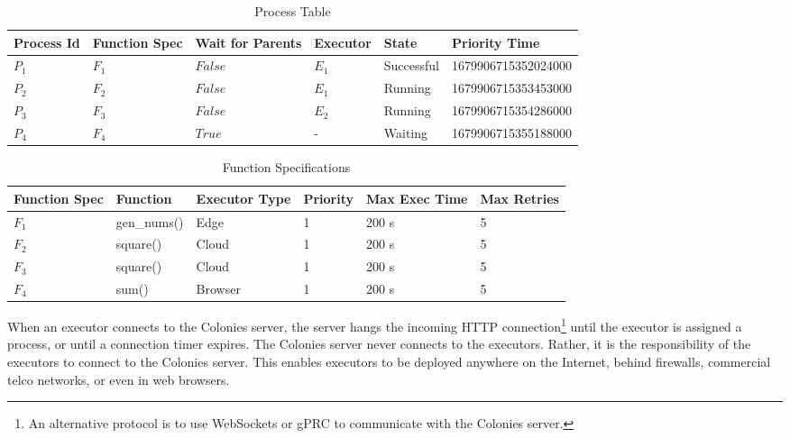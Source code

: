 \documentclass{article}
\begin{document}
\begin{table}[t]
	\caption{Process Table}
	\centering
	\begin{tabular}{llllll}
		\toprule
		\cmidrule(r){1-2}
        Process Id & Function Spec & Wait for Parents & Executor  & State      & Priority Time \\
		\midrule
        $P_{1}$    & $F_{1}$       & $False$          & $E_{1}$   & Successful & 1679906715352024000 \\
        $P_{2}$    & $F_{2}$       & $False$          & $E_{1}$   & Running    & 1679906715353453000 \\
        $P_{3}$    & $F_{3}$       & $False$          & $E_{2}$   & Running    & 1679906715354286000 \\
        $P_{4}$    & $F_{4}$       & $True$           & -         & Waiting    & 1679906715355188000 \\
		\bottomrule
	\end{tabular}
	\label{proctable}
\end{table}

\begin{table}[t]
	\caption{Function Specifications}
	\centering
	\begin{tabular}{llllll}
		\toprule
		\cmidrule(r){1-2}
        Function Spec & Function        & Executor Type & Priority & Max Exec Time & Max Retries \\
		\midrule
        $F_{1}$       & gen\_nums()     & Edge          & 1        & 200 s         & 5 \\
        $F_{2}$       & square()        & Cloud         & 1        & 200 s         & 5 \\
        $F_{3}$       & square()        & Cloud         & 1        & 200 s         & 5 \\
        $F_{4}$       & sum()           & Browser       & 1        & 200 s         & 5 \\
		\bottomrule
	\end{tabular}
	\label{functable}
\end{table}

When an executor connects to the Colonies server, the server hangs the incoming HTTP connection\footnote{An alternative protocol is to use WebSockets or gPRC to communicate with the Colonies server.} until the executor is assigned a process, or until a connection timer expires. The Colonies server never connects to the executors. Rather, it is the responsibility of the executors to connect to the Colonies server. This enables executors to be deployed anywhere on the Internet, behind firewalls, commercial telco networks, or even in web browsers.
\end{document}
